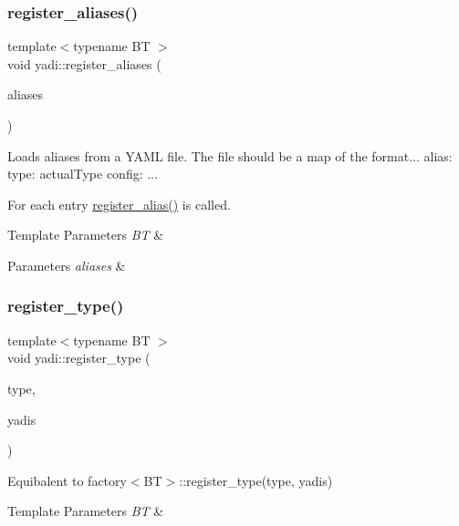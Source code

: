 \subsubsection{\texorpdfstring{register\+\_\+aliases()}{register\_aliases()}}
{\footnotesize\ttfamily template$<$typename BT $>$ \\
void yadi\+::register\+\_\+aliases (\begin{DoxyParamCaption}\item[{Y\+A\+M\+L\+::\+Node}]{aliases }\end{DoxyParamCaption})}



Loads aliases from a Y\+A\+ML file. The file should be a map of the format... alias\+: type\+: actual\+Type config\+: ... 

For each entry \hyperlink{namespaceyadi_a5f8e048a8bef5792a7c5b3aae435999d}{register\+\_\+alias()} is called. 
\begin{DoxyTemplParams}{Template Parameters}
{\em BT} & \\
\hline
\end{DoxyTemplParams}

\begin{DoxyParams}{Parameters}
{\em aliases} & \\
\hline
\end{DoxyParams}
\mbox{\label{namespaceyadi_a848729993f692098bf175774503b80ee}} 
\subsubsection{\texorpdfstring{register\+\_\+type()}{register\_type()}\hspace{0.1cm}{\footnotesize\ttfamily [1/3]}}
{\footnotesize\ttfamily template$<$typename BT $>$ \\
void yadi\+::register\+\_\+type (\begin{DoxyParamCaption}\item[{std\+::string}]{type,  }\item[{yadi\+\_\+info\+\_\+t$<$ BT $>$}]{yadis }\end{DoxyParamCaption})}



Equibalent to factory$<$\+B\+T$>$\+::register\+\_\+type(type, yadis) 


\begin{DoxyTemplParams}{Template Parameters}
{\em BT} & \\
\hline
\end{DoxyTemplParams}

